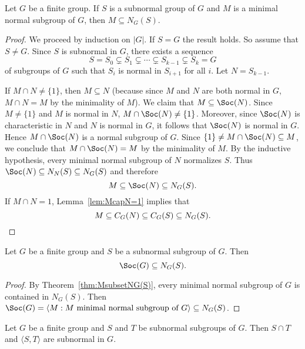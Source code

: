 \begin{theorem}[Wielandt]
	\label{thm:MsubsetNG(S)}
	Let $G$ be a finite group. If $S$ is a subnormal group of $G$ and 
	$M$ is a minimal normal subgroup of $G$, then $M\subseteq N_G(S)$.
\end{theorem}

\begin{proof}
	We proceed by induction on $|G|$. If $S=G$ the result holds. So assume that 
	$S\ne G$.  Since $S$ is subnormal in $G$, there exists a sequence 
	\[
		S=S_0\subsetneq S_1\subsetneq\cdots\subsetneq S_{k-1}\subsetneq S_k=G
	\]
    of subgroups of $G$ such that $S_i$ is normal in $S_{i+1}$ for all $i$. 
	Let $N=S_{k-1}$. 

	If $M\cap N\ne\{1\}$, then $M\subseteq N$ (because since $M$ and $N$ are both normal in $G$, 
	$M\cap N=M$ by the minimality of $M$). We claim that 
	$M\subseteq\Soc(N)$.  Since $M\ne\{1\}$ and $M$ is normal in $N$,
	$M\cap\Soc(N)\ne\{1\}$. Moreover, since $\Soc(N)$ is characteristic in $N$ and $N$ is 
	normal in $G$, it follows that $\Soc(N)$ is normal in $G$. Hence $M\cap\Soc(N)$ is a normal subgroup of $G$. 
	Since $\{1\}\ne M\cap\Soc(N)\subseteq M$, we conclude that 
	$M\cap\Soc(N)=M$ by the minimality of $M$. By the inductive hypothesis, 
	every minimal normal subgroup of $N$ normalizes $S$. Thus 
	$\Soc(N)\subseteq N_N(S)\subseteq N_G(S)$ and therefore 
	\[
	M\subseteq\Soc(N)\subseteq N_G(S).
	\]
	If $M\cap N=1$, Lemma~\ref{lem:McapN=1} implies that 
	\[
	M\subseteq C_G(N)\subseteq C_G(S)\subseteq N_G(S). \qedhere
	\]
\end{proof}

\begin{corollary}
    Let $G$ be a finite group and $S$ be a subnormal subgroup of $G$. Then 
    \[
    \Soc(G)\subseteq N_G(S).
    \]
\end{corollary}

\begin{proof}
	By Theorem~\ref{thm:MsubsetNG(S)}, every minimal normal subgroup of $G$ is contained in $N_G(S)$. Then 
	$\Soc(G)=\langle M:M\text{ minimal normal subgroup of $G$}\rangle\subseteq N_G(S)$.
\end{proof}

\begin{theorem}[Wielandt]
	\label{thm:STsubnormal}
	Let $G$ be a finite group and $S$ and $T$ be subnormal subgroups of $G$. Then $S\cap T$ and 
	$\langle S,T\rangle$ are subnormal in $G$.
\end{theorem}

